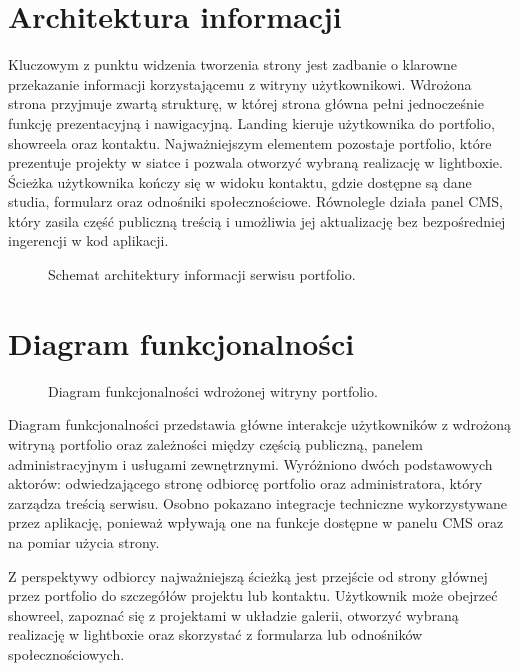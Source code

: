 \chapter{Architektura informacji}

Kluczowym z punktu widzenia tworzenia strony jest zadbanie o klarowne przekazanie informacji korzystającemu z witryny użytkownikowi.
Wdrożona strona przyjmuje zwartą strukturę, w której strona główna pełni jednocześnie funkcję prezentacyjną i nawigacyjną.
Landing kieruje użytkownika do portfolio, showreela oraz kontaktu. Najważniejszym elementem pozostaje portfolio, które prezentuje projekty w siatce i pozwala otworzyć wybraną realizację w lightboxie.
Ścieżka użytkownika kończy się w widoku kontaktu, gdzie dostępne są dane studia, formularz oraz odnośniki społecznościowe.
Równolegle działa panel CMS, który zasila część publiczną treścią i umożliwia jej aktualizację bez bezpośredniej ingerencji w kod aplikacji.

\begin{figure}[H]
    \centering
    \resizebox{\textwidth}{!}{}
    \caption{Schemat architektury informacji serwisu portfolio.}
\end{figure}

\chapter{Diagram funkcjonalności}

\begin{figure}[H]
    \centering
    \resizebox{\textwidth}{!}{}
    \caption{Diagram funkcjonalności wdrożonej witryny portfolio.}
\end{figure}

Diagram funkcjonalności przedstawia główne interakcje użytkowników z wdrożoną witryną portfolio oraz zależności między częścią publiczną, panelem administracyjnym i usługami zewnętrznymi. Wyróżniono dwóch podstawowych aktorów: odwiedzającego stronę odbiorcę portfolio oraz administratora, który zarządza treścią serwisu. Osobno pokazano integracje techniczne wykorzystywane przez aplikację, ponieważ wpływają one na funkcje dostępne w panelu CMS oraz na pomiar użycia strony.

Z perspektywy odbiorcy najważniejszą ścieżką jest przejście od strony głównej przez portfolio do szczegółów projektu lub kontaktu. Użytkownik może obejrzeć showreel, zapoznać się z projektami w układzie galerii, otworzyć wybraną realizację w lightboxie oraz skorzystać z formularza lub odnośników społecznościowych.

